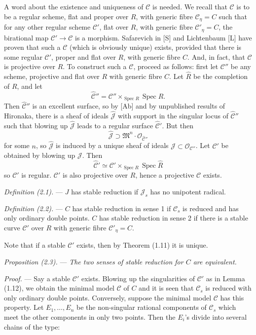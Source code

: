 \documentclass[10pt]{article}
\newcommand{\Spec}{\operatorname{Spec}}
\newcommand{\cO}{\mathcal O}
\begin{document}
A word about the existence and uniqueness of $\mathscr C$ is needed. We recall that $\mathscr C$ is to be a regular scheme, flat and proper over $R$, with generic fibre $\mathscr C_\eta=C$ such that for any other regular scheme $\mathscr C'$, flat over $R$, with generic fibre $\mathscr C'_\eta=C$, the birational map $\mathscr C'\to\mathscr C$ is a morphism. Safarevich in [S] and Lichtenbaum [L] have proven that such a $\mathscr C$ (which is obviously unique) exists, provided that there is some regular $\mathscr C'$, proper and flat over $R$, with generic fibre $C$. And, in fact, that $\mathscr C$ is projective over $R$. To construct such a $\mathscr C$, proceed as follows: first let $\mathscr C''$ be any scheme, projective and flat over $R$ with generic fibre $C$. Let $\widehat R$ be the completion of $R$, and let
\[
\widehat{\mathscr C}''=\mathscr C''\times_{\Spec R}\Spec\widehat R.
\]
Then $\widehat{\mathscr C}''$ is an excellent surface, so by [Ab] and by unpublished results of Hironaka, there is a sheaf of ideals $\widehat{\mathcal J}$ with support in the singular locus of $\widehat{\mathscr C}''$ such that blowing up $\widehat{\mathcal J}$ leads to a regular surface $\widehat{\mathscr C}'$. But then
\[
\widehat{\mathcal J}\supset \mathfrak M^n\cdot\cO_{\widehat{\mathscr C}''}
\]
for some $n$, so $\widehat{\mathcal J}$ is induced by a unique sheaf of ideals $\mathcal J\subset\cO_{\mathscr C''}$. Let $\mathscr C'$ be obtained by blowing up $\mathcal J$. Then
\[
\widehat{\mathscr C}'\simeq \mathscr C'\times_{\Spec R}\Spec\widehat R
\]
so $\mathscr C'$ is regular. $\mathscr C'$ is also projective over $R$, hence a projective $\mathscr C$ exists.


\noindent\emph{Definition (2.1).} --- $J$ has stable reduction if $\mathscr J_s$ has no unipotent radical.

\noindent\emph{Definition (2.2).} --- $C$ has stable reduction in sense 1 if $\mathscr C_s$ is reduced and has only ordinary double points. $C$ has stable reduction in sense 2 if there is a stable curve $\mathscr C'$ over $R$ with generic fibre $\mathscr C'_\eta=C$.

Note that if a stable $\mathscr C'$ exists, then by Theorem (1.11) it is unique.

\medskip
\noindent\emph{Proposition (2.3).} --- \emph{The two senses of stable reduction for $C$ are equivalent.}

\noindent\emph{Proof.} --- Say a stable $\mathscr C'$ exists. Blowing up the singularities of $\mathscr C'$ as in Lemma (1.12), we obtain the minimal model $\mathscr C$ of $C$ and it is seen that $\mathscr C_s$ is reduced with only ordinary double points. Conversely, suppose the minimal model $\mathscr C$ has this property. Let $E_1,\ldots,E_n$ be the non-singular rational components of $\mathscr C_s$ which meet the other components in only two points. Then the $E_i$'s divide into several chains of the type:
\end{document}
